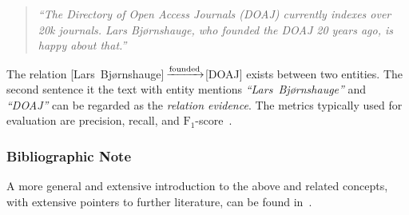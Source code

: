 \begin{quote}
\textit{``The Directory of Open Access Journals (DOAJ) currently indexes over 20k journals. Lars Bj{\o}rnshauge, who founded the DOAJ 20 years ago, is happy about that.''}
\end{quote}

The relation [Lars~Bj{\o}rnshauge]\,$\xrightarrow[]{\text{\texttt\tiny founded}}$[DOAJ] exists between two entities. The second sentence it the text with entity mentions \textit{``Lars~Bj{\o}rnshauge''} and \textit{``DOAJ''} can be regarded as the \emph{relation evidence}. The metrics typically used for evaluation are precision, recall, and $\text{F}_1$-score~\cite{Nasar2021}.

\subsubsection{Bibliographic Note}

A more general and extensive introduction to the above and related concepts, with extensive pointers to further literature, can be found in~\cite{Aggarwal2018}.


